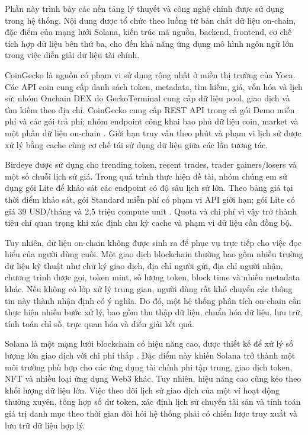 Phần này trình bày các nền tảng lý thuyết và công nghệ chính được sử dụng trong hệ thống. Nội dung được tổ chức theo luồng từ bản chất dữ liệu on-chain, đặc điểm của mạng lưới Solana, kiến trúc mã nguồn, backend, frontend, cơ chế tích hợp dữ liệu bên thứ ba, cho đến khả năng ứng dụng mô hình ngôn ngữ lớn trong việc diễn giải dữ liệu tài chính.

CoinGecko là nguồn có phạm vi sử dụng rộng nhất ở miền thị trường của Yoca. Các API coin cung cấp danh sách token, metadata, tìm kiếm, giá, vốn hóa và lịch sử; nhóm Onchain DEX do GeckoTerminal cung cấp dữ liệu pool, giao dịch và tìm kiếm theo địa chỉ. CoinGecko cung cấp REST API trong cả gói Demo miễn phí và các gói trả phí; nhóm endpoint công khai bao phủ dữ liệu coin, market và một phần dữ liệu on-chain \cite{coingecko-api-docs}. Giới hạn truy vấn theo phút và phạm vi lịch sử được xử lý bằng cache cùng cơ chế tái sử dụng dữ liệu giữa các lần tương tác.

Birdeye được sử dụng cho trending token, recent trades, trader gainers/losers và một số chuỗi lịch sử giá. Trong quá trình thực hiện đề tài, nhóm chúng em sử dụng gói Lite để khảo sát các endpoint có độ sâu lịch sử lớn. Theo bảng giá tại thời điểm khảo sát, gói Standard miễn phí có phạm vi API giới hạn; gói Lite có giá 39 USD/tháng và 2,5 triệu compute unit \cite{birdeye-pricing}. Quota và chi phí vì vậy trở thành tiêu chí quan trọng khi xác định chu kỳ cache và phạm vi dữ liệu cần đồng bộ.

Tuy nhiên, dữ liệu on-chain không được sinh ra để phục vụ trực tiếp cho việc đọc hiểu của người dùng cuối. Một giao dịch blockchain thường bao gồm nhiều trường dữ liệu kỹ thuật như chữ ký giao dịch, địa chỉ người gửi, địa chỉ người nhận, chương trình được gọi, token mint, số lượng token, block time và nhiều metadata khác. Nếu không có lớp xử lý trung gian, người dùng rất khó chuyển các thông tin này thành nhận định có ý nghĩa. Do đó, một hệ thống phân tích on-chain cần thực hiện nhiều bước xử lý, bao gồm thu thập dữ liệu, chuẩn hóa dữ liệu, lưu trữ, tính toán chỉ số, trực quan hóa và diễn giải kết quả.

Solana là một mạng lưới blockchain có hiệu năng cao, được thiết kế để xử lý số lượng lớn giao dịch với chi phí thấp \cite{solana}. Đặc điểm này khiến Solana trở thành một môi trường phù hợp cho các ứng dụng tài chính phi tập trung, giao dịch token, NFT và nhiều loại ứng dụng Web3 khác. Tuy nhiên, hiệu năng cao cũng kéo theo khối lượng dữ liệu lớn. Việc theo dõi lịch sử giao dịch của một ví hoạt động thường xuyên, tổng hợp số dư token, xác định lịch sử chuyển tài sản và tính toán giá trị danh mục theo thời gian đòi hỏi hệ thống phải có chiến lược truy xuất và lưu trữ dữ liệu hợp lý.

